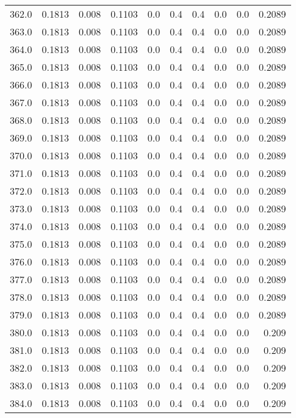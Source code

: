 \begin{longtable}{lrrrrrrrrr}
362.0 & 0.1813 & 0.008 & 0.1103 & 0.0 & 0.4 & 0.4 & 0.0 & 0.0 & 0.2089 \\
363.0 & 0.1813 & 0.008 & 0.1103 & 0.0 & 0.4 & 0.4 & 0.0 & 0.0 & 0.2089 \\
364.0 & 0.1813 & 0.008 & 0.1103 & 0.0 & 0.4 & 0.4 & 0.0 & 0.0 & 0.2089 \\
365.0 & 0.1813 & 0.008 & 0.1103 & 0.0 & 0.4 & 0.4 & 0.0 & 0.0 & 0.2089 \\
366.0 & 0.1813 & 0.008 & 0.1103 & 0.0 & 0.4 & 0.4 & 0.0 & 0.0 & 0.2089 \\
367.0 & 0.1813 & 0.008 & 0.1103 & 0.0 & 0.4 & 0.4 & 0.0 & 0.0 & 0.2089 \\
368.0 & 0.1813 & 0.008 & 0.1103 & 0.0 & 0.4 & 0.4 & 0.0 & 0.0 & 0.2089 \\
369.0 & 0.1813 & 0.008 & 0.1103 & 0.0 & 0.4 & 0.4 & 0.0 & 0.0 & 0.2089 \\
370.0 & 0.1813 & 0.008 & 0.1103 & 0.0 & 0.4 & 0.4 & 0.0 & 0.0 & 0.2089 \\
371.0 & 0.1813 & 0.008 & 0.1103 & 0.0 & 0.4 & 0.4 & 0.0 & 0.0 & 0.2089 \\
372.0 & 0.1813 & 0.008 & 0.1103 & 0.0 & 0.4 & 0.4 & 0.0 & 0.0 & 0.2089 \\
373.0 & 0.1813 & 0.008 & 0.1103 & 0.0 & 0.4 & 0.4 & 0.0 & 0.0 & 0.2089 \\
374.0 & 0.1813 & 0.008 & 0.1103 & 0.0 & 0.4 & 0.4 & 0.0 & 0.0 & 0.2089 \\
375.0 & 0.1813 & 0.008 & 0.1103 & 0.0 & 0.4 & 0.4 & 0.0 & 0.0 & 0.2089 \\
376.0 & 0.1813 & 0.008 & 0.1103 & 0.0 & 0.4 & 0.4 & 0.0 & 0.0 & 0.2089 \\
377.0 & 0.1813 & 0.008 & 0.1103 & 0.0 & 0.4 & 0.4 & 0.0 & 0.0 & 0.2089 \\
378.0 & 0.1813 & 0.008 & 0.1103 & 0.0 & 0.4 & 0.4 & 0.0 & 0.0 & 0.2089 \\
379.0 & 0.1813 & 0.008 & 0.1103 & 0.0 & 0.4 & 0.4 & 0.0 & 0.0 & 0.2089 \\
380.0 & 0.1813 & 0.008 & 0.1103 & 0.0 & 0.4 & 0.4 & 0.0 & 0.0 & 0.209 \\
381.0 & 0.1813 & 0.008 & 0.1103 & 0.0 & 0.4 & 0.4 & 0.0 & 0.0 & 0.209 \\
382.0 & 0.1813 & 0.008 & 0.1103 & 0.0 & 0.4 & 0.4 & 0.0 & 0.0 & 0.209 \\
383.0 & 0.1813 & 0.008 & 0.1103 & 0.0 & 0.4 & 0.4 & 0.0 & 0.0 & 0.209 \\
384.0 & 0.1813 & 0.008 & 0.1103 & 0.0 & 0.4 & 0.4 & 0.0 & 0.0 & 0.209 \\

\end{longtable}
